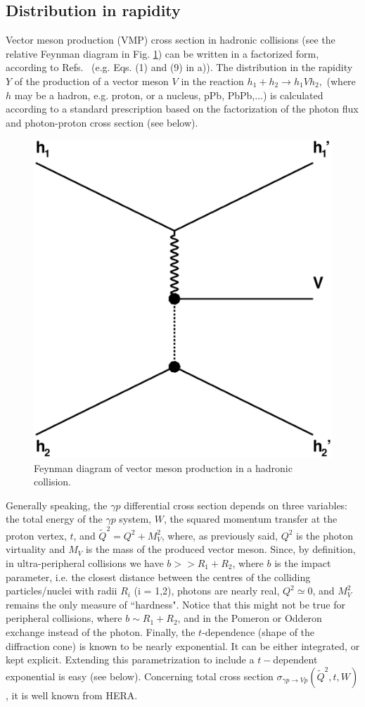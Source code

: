 \documentclass[12pt]{article}
\begin{document}
\subsection{Distribution in rapidity}\label{distribution}
Vector meson production (VMP) cross section in hadronic collisions (see the relative Feynman diagram in Fig. \ref{fig:vmp_feynman}) can be written in a factorized form, according to Refs.~ \cite{Brazil, Review} (e.g. Eqs. (1) and (9) in \cite{Brazil}a)).
The distribution in the rapidity $Y$ of the production of a vector meson $V$ in the reaction $h_1+h_2\rightarrow h_1Vh_2,$ (where $h$ may be a hadron, e.g. proton, or a nucleus, pPb, PbPb,...) is calculated according to a standard prescription based on the factorization of the photon flux and photon-proton cross section (see below).

\begin{figure}[!h]
\centering
 \includegraphics[width=.4\textwidth]{figures/exclusive_vmp.eps}
 \caption{Feynman diagram of vector meson production in a hadronic collision.}
 \label{fig:vmp_feynman}
\end{figure}

Generally speaking, the $\gamma p$ differential cross section depends on three variables: the total energy   of the $\gamma p$ system, $W$, 
the squared momentum transfer at the proton vertex, $t$, and $\widetilde Q^2=Q^2+M_V^2$, where, as previously said, $Q^2$ is the photon virtuality and $M_V$ is the mass of the produced vector meson. Since, by definition, in ultra-peripheral collisions we have $b>>R_1+R_2$, where $b$ is the impact parameter, i.e. the closest distance between the centres of the colliding particles/nuclei with radii  $R_i$ (i = 1,2),
photons are nearly real, $Q^2 \simeq 0$, and $M_V^2$ remains the only measure of ``hardness". Notice that this might not be true for peripheral collisions, where $b\sim R_1+R_2$, and in the 
Pomeron or Odderon exchange instead of the photon. Finally, the $t$-dependence (shape of the diffraction cone) is known to be nearly exponential. It can be either integrated, or
kept explicit. Extending this parametrization to include a $t-$dependent exponential is easy (see below).
Concerning total cross section $\sigma_{\gamma p\rightarrow Vp}(\widetilde Q^2, t, W)$, it is well known from HERA. 
\end{document}
